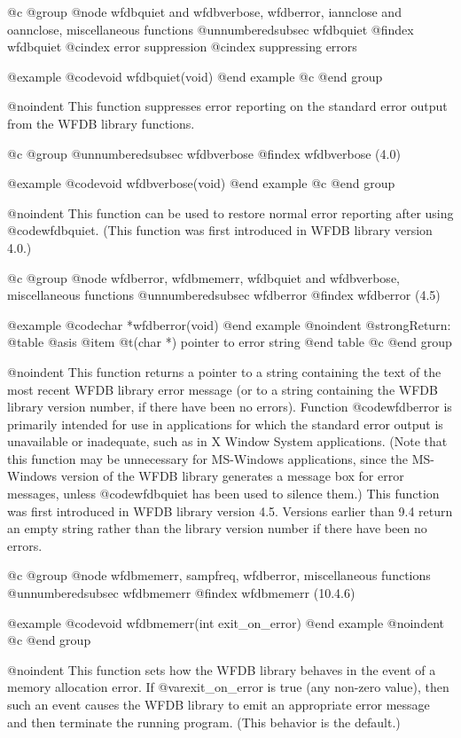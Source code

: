 {{{{{{{{@c @group
@node     wfdbquiet and wfdbverbose, wfdberror, iannclose and oannclose, miscellaneous functions
@unnumberedsubsec wfdbquiet
@findex wfdbquiet
@cindex error suppression
@cindex suppressing errors

@example
@code{void wfdbquiet(void)}
@end example
@c @end group

@noindent
This function suppresses error reporting on the standard error output
from the WFDB library functions.

@c @group
@unnumberedsubsec wfdbverbose
@findex wfdbverbose (4.0)

@example
@code{void wfdbverbose(void)}
@end example
@c @end group

@noindent
This function can be used to restore normal error reporting after using
@code{wfdbquiet}.  (This function was first introduced in WFDB library
version 4.0.)

@c @group
@node     wfdberror, wfdbmemerr, wfdbquiet and wfdbverbose, miscellaneous functions
@unnumberedsubsec wfdberror
@findex wfdberror (4.5)

@example
@code{char *wfdberror(void)}
@end example
@noindent
@strong{Return:}
@table @asis
@item @t{(char *)}
pointer to error string
@end table
@c @end group

@noindent
This function returns a pointer to a string containing the text of the
most recent WFDB library error message (or to a string containing the WFDB
library version number, if there have been no errors).  Function
@code{wfdberror} is primarily intended for use in applications for which the
standard error output is unavailable or inadequate, such as in X Window
System applications.  (Note that this function may be unnecessary for
MS-Windows applications, since the MS-Windows version of the WFDB library
generates a message box for error messages, unless @code{wfdbquiet} has
been used to silence them.)  This function was first introduced in WFDB
library version 4.5.  Versions earlier than 9.4 return an empty string
rather than the library version number if there have been no errors.

@c @group
@node     wfdbmemerr, sampfreq, wfdberror, miscellaneous functions
@unnumberedsubsec wfdbmemerr
@findex wfdbmemerr (10.4.6)

@example
@code{void wfdbmemerr(int exit_on_error)}
@end example
@noindent
@c @end group

@noindent
This function sets how the WFDB library behaves in the event of a memory
allocation error.  If @var{exit_on_error} is true (any non-zero value), then
such an event causes the WFDB library to emit an appropriate error message
and then terminate the running program.  (This behavior is the default.)

}}}}}}}}
